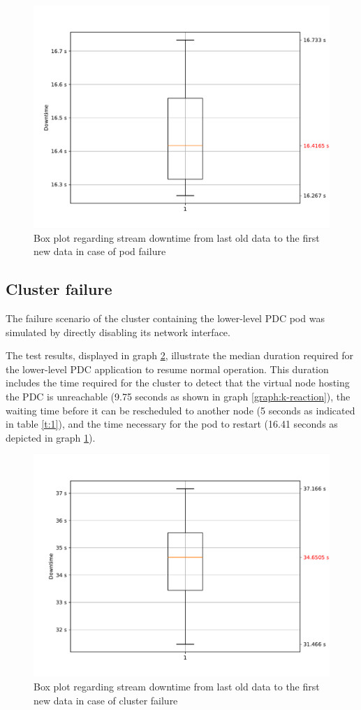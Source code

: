 \begin{figure}[ht]\centering
\includegraphics[scale=0.5]{Pictures/pdc-pod-down}
\caption{Box plot regarding stream downtime from last old data to the first new data in case of pod failure}\label{graph:pod-down}
\end{figure}

\subsection{Cluster failure}
The failure scenario of the cluster containing the lower-level PDC pod was simulated by directly disabling its network interface.

The test results, displayed in graph \ref{graph:cluster-down}, illustrate the median duration required for the lower-level PDC application to resume normal operation. This duration includes the time required for the cluster to detect that the virtual node hosting the PDC is unreachable (9.75 seconds as shown in graph \ref{graph:k-reaction}), the waiting time before it can be rescheduled to another node (5 seconds as indicated in table \ref{t:1}), and the time necessary for the pod to restart (16.41 seconds as depicted in graph \ref{graph:pod-down}).

\begin{figure}[ht]\centering
\includegraphics[scale=0.5]{Pictures/pdc-cluster-down}
\caption{Box plot regarding stream downtime from last old data to the first new data in case of cluster failure}\label{graph:cluster-down}
\end{figure}



